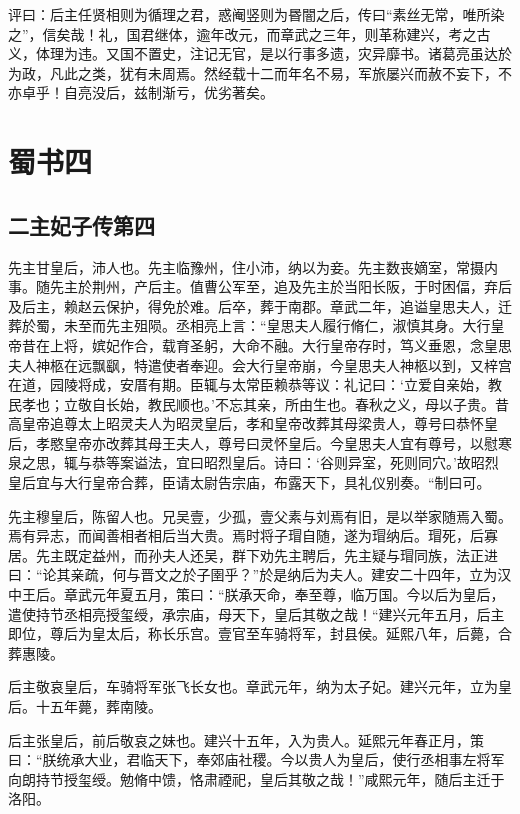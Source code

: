 \documentclass[12pt,UTF8]{ctexbook}
\begin{document}
评曰：后主任贤相则为循理之君，惑阉竖则为昬闇之后，传曰“素丝无常，唯所染之”，信矣哉！礼，国君继体，逾年改元，而章武之三年，则革称建兴，考之古义，体理为违。又国不置史，注记无官，是以行事多遗，灾异靡书。诸葛亮虽达於为政，凡此之类，犹有未周焉。然经载十二而年名不易，军旅屡兴而赦不妄下，不亦卓乎！自亮没后，兹制渐亏，优劣著矣。

\part{蜀书四}
\chapter{二主妃子传第四}

先主甘皇后，沛人也。先主临豫州，住小沛，纳以为妾。先主数丧嫡室，常摄内事。随先主於荆州，产后主。值曹公军至，追及先主於当阳长阪，于时困偪，弃后及后主，赖赵云保护，得免於难。后卒，葬于南郡。章武二年，追谥皇思夫人，迁葬於蜀，未至而先主殂陨。丞相亮上言：“皇思夫人履行脩仁，淑慎其身。大行皇帝昔在上将，嫔妃作合，载育圣躬，大命不融。大行皇帝存时，笃义垂恩，念皇思夫人神柩在远飘飖，特遣使者奉迎。会大行皇帝崩，今皇思夫人神柩以到，又梓宫在道，园陵将成，安厝有期。臣辄与太常臣赖恭等议：礼记曰：‘立爱自亲始，教民孝也；立敬自长始，教民顺也。’不忘其亲，所由生也。春秋之义，母以子贵。昔高皇帝追尊太上昭灵夫人为昭灵皇后，孝和皇帝改葬其母梁贵人，尊号曰恭怀皇后，孝愍皇帝亦改葬其母王夫人，尊号曰灵怀皇后。今皇思夫人宜有尊号，以慰寒泉之思，辄与恭等案谥法，宜曰昭烈皇后。诗曰：‘谷则异室，死则同穴。’故昭烈皇后宜与大行皇帝合葬，臣请太尉告宗庙，布露天下，具礼仪别奏。“制曰可。

先主穆皇后，陈留人也。兄吴壹，少孤，壹父素与刘焉有旧，是以举家随焉入蜀。焉有异志，而闻善相者相后当大贵。焉时将子瑁自随，遂为瑁纳后。瑁死，后寡居。先主既定益州，而孙夫人还吴，群下劝先主聘后，先主疑与瑁同族，法正进曰：“论其亲疏，何与晋文之於子圉乎？”於是纳后为夫人。建安二十四年，立为汉中王后。章武元年夏五月，策曰：“朕承天命，奉至尊，临万国。今以后为皇后，遣使持节丞相亮授玺绶，承宗庙，母天下，皇后其敬之哉！“建兴元年五月，后主即位，尊后为皇太后，称长乐宫。壹官至车骑将军，封县侯。延熙八年，后薨，合葬惠陵。

后主敬哀皇后，车骑将军张飞长女也。章武元年，纳为太子妃。建兴元年，立为皇后。十五年薨，葬南陵。

后主张皇后，前后敬哀之妹也。建兴十五年，入为贵人。延熙元年春正月，策曰：“朕统承大业，君临天下，奉郊庙社稷。今以贵人为皇后，使行丞相事左将军向朗持节授玺绶。勉脩中馈，恪肃禋祀，皇后其敬之哉！”咸熙元年，随后主迁于洛阳。
\end{document}
